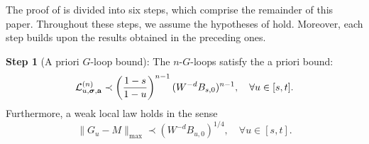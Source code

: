 The proof of  is divided into six steps, which comprise the remainder of this paper. Throughout these steps, we assume the hypotheses of  hold. Moreover, each step builds upon the results obtained in the preceding ones.



\medskip 
\noindent
\textbf{Step 1} (A priori $G$-loop bound):  
The $n$-$G$-loops satisfy the a priori bound: 
 \begin{equation}\label{lRB1}
   {\mathcal L}^{(n)}_{u,{\boldsymbol{\sigma}}, \mathbf{a}}\prec \left({\frac{1-s}{1-u}}\right)^{n-1}  
   (W^{-d}B_{s,0})^{n-1},\quad  \forall  u\in [s, t].
\end{equation}
Furthermore, a weak local law holds in the sense 
\begin{equation}\label{Gtmwc}
    \|G_u-M\|_{\max}\prec  (W^{-d}B_{u,0})^{1/4},\quad \forall  u\in [s, t] .
\end{equation} 
  

